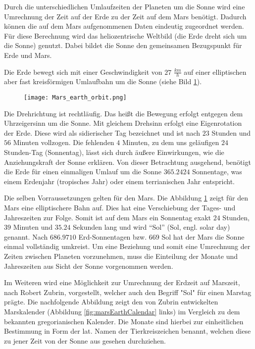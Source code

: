 Durch die unterschiedlichen Umlaufzeiten der Planeten um die Sonne wird eine
Umrechnung der Zeit auf der Erde zu der Zeit auf dem Mars ben{\"o}tigt.
Dadurch k{\"o}nnen die auf dem Mars aufgenommenen Daten eindeutig zugeordnet
werden.
F{\"u}r diese Berechnung wird das heliozentrische Weltbild (die Erde dreht sich
um die Sonne) genutzt.
Dabei bildet die Sonne den gemeinsamen Bezugspunkt f{\"u}r Erde und Mars.

Die Erde bewegt sich mit einer Geschwindigkeit von $27$ $\frac{km}{h}$ auf einer
elliptischen aber fast kreisf{\"o}rmigen Umlaufbahn um die Sonne (siehe Bild
\ref{fig:marsEarthOrbit}).

\begin{figure}[H]
	\centering
	\texttt{[image: Mars\_earth\_orbit.png]}
	\label{fig:marsEarthOrbit}
\end{figure}

Die Drehrichtung ist rechtl{\"a}ufig. Das hei{\ss}t die Bewegung erfolgt
entgegen dem Uhrzeigersinn um die Sonne. Mit gleichem Drehsinn erfolgt eine Eigenrotation
der Erde. Diese wird als sidierischer Tag bezeichnet und ist nach $23$ Stunden
und $56$ Minuten vollzogen. Die fehlenden $4$ Minuten, zu dem uns gel{\"a}ufigen
$24$ Stunden-Tag (Sonnentag), l{\"a}sst sich durch {\"a}u{\ss}ere Einwirkungen,
wie die Anziehungskraft der Sonne erkl{\"a}ren. Von dieser Betrachtung ausgehend, ben{\"o}tigt
die Erde f{\"u}r einen einmaligen Umlauf um die Sonne $365.2424$ Sonnentage, was
einem Erdenjahr (tropisches Jahr) oder einem terrianischen Jahr entspricht. 

Die selben Vorraussetzungen gelten f{\"u}r den Mars. Die Abbildung
\ref{fig:marsEarthOrbit} zeigt f{\"u}r den Mars eine elliptischere Bahn
auf. Dies hat eine Verschiebung der Tages- und Jahreszeiten zur Folge. Somit ist
auf dem Mars ein Sonnentag exakt $24$ Stunden, $39$ Minuten und $35.24$ Sekunden lang und
wird "`Sol"' (Sol, engl. solar day) genannt. Nach $686.9710$ Erd-Sonnentagen
bzw. $669$ Sol hat der Mars die Sonne einmal vollst{\"a}ndig umkreist. Um eine Beziehung
und somit eine Umrechnung der Zeiten zwischen Planeten vorzunehmen, muss die
Einteilung der Monate und Jahreszeiten aus Sicht der Sonne vorgenommen werden.

Im Weiteren wird eine M{\"o}glichkeit zur Umrechnung der Erdzeit auf Marszeit,
nach Robert Zubrin, vorgestellt, welcher auch den Begriff "Sol"
f{\"u}r einen Marstag pr{\"a}gte. Die nachfolgende Abbildung zeigt den von Zubrin entwickelten
Marskalender (Abbildung \ref{fig:marsEarthCalendar} links) im Vergleich zu dem
bekannten gregorianischen Kalender. Die Monate sind hierbei zur einheitlichen
Bestimmung in Form der lat. Namen der Tierkreiszeichen benannt, welchen diese
 zu jener Zeit von der Sonne aus
gesehen durchziehen.

